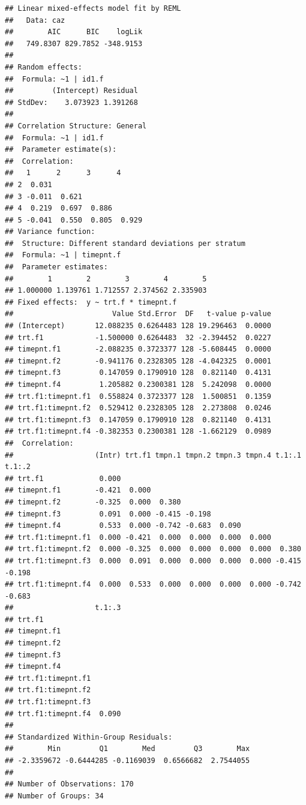 \documentclass[
]{book}
\begin{document}
\begin{verbatim}
## Linear mixed-effects model fit by REML
##   Data: caz 
##        AIC      BIC    logLik
##   749.8307 829.7852 -348.9153
## 
## Random effects:
##  Formula: ~1 | id1.f
##         (Intercept) Residual
## StdDev:    3.073923 1.391268
## 
## Correlation Structure: General
##  Formula: ~1 | id1.f 
##  Parameter estimate(s):
##  Correlation: 
##   1      2      3      4     
## 2  0.031                     
## 3 -0.011  0.621              
## 4  0.219  0.697  0.886       
## 5 -0.041  0.550  0.805  0.929
## Variance function:
##  Structure: Different standard deviations per stratum
##  Formula: ~1 | timepnt.f 
##  Parameter estimates:
##        1        2        3        4        5 
## 1.000000 1.139761 1.712557 2.374562 2.335903 
## Fixed effects:  y ~ trt.f * timepnt.f 
##                       Value Std.Error  DF   t-value p-value
## (Intercept)       12.088235 0.6264483 128 19.296463  0.0000
## trt.f1            -1.500000 0.6264483  32 -2.394452  0.0227
## timepnt.f1        -2.088235 0.3723377 128 -5.608445  0.0000
## timepnt.f2        -0.941176 0.2328305 128 -4.042325  0.0001
## timepnt.f3         0.147059 0.1790910 128  0.821140  0.4131
## timepnt.f4         1.205882 0.2300381 128  5.242098  0.0000
## trt.f1:timepnt.f1  0.558824 0.3723377 128  1.500851  0.1359
## trt.f1:timepnt.f2  0.529412 0.2328305 128  2.273808  0.0246
## trt.f1:timepnt.f3  0.147059 0.1790910 128  0.821140  0.4131
## trt.f1:timepnt.f4 -0.382353 0.2300381 128 -1.662129  0.0989
##  Correlation: 
##                   (Intr) trt.f1 tmpn.1 tmpn.2 tmpn.3 tmpn.4 t.1:.1 t.1:.2
## trt.f1             0.000                                                 
## timepnt.f1        -0.421  0.000                                          
## timepnt.f2        -0.325  0.000  0.380                                   
## timepnt.f3         0.091  0.000 -0.415 -0.198                            
## timepnt.f4         0.533  0.000 -0.742 -0.683  0.090                     
## trt.f1:timepnt.f1  0.000 -0.421  0.000  0.000  0.000  0.000              
## trt.f1:timepnt.f2  0.000 -0.325  0.000  0.000  0.000  0.000  0.380       
## trt.f1:timepnt.f3  0.000  0.091  0.000  0.000  0.000  0.000 -0.415 -0.198
## trt.f1:timepnt.f4  0.000  0.533  0.000  0.000  0.000  0.000 -0.742 -0.683
##                   t.1:.3
## trt.f1                  
## timepnt.f1              
## timepnt.f2              
## timepnt.f3              
## timepnt.f4              
## trt.f1:timepnt.f1       
## trt.f1:timepnt.f2       
## trt.f1:timepnt.f3       
## trt.f1:timepnt.f4  0.090
## 
## Standardized Within-Group Residuals:
##        Min         Q1        Med         Q3        Max 
## -2.3359672 -0.6444285 -0.1169039  0.6566682  2.7544055 
## 
## Number of Observations: 170
## Number of Groups: 34
\end{verbatim}
\end{document}
